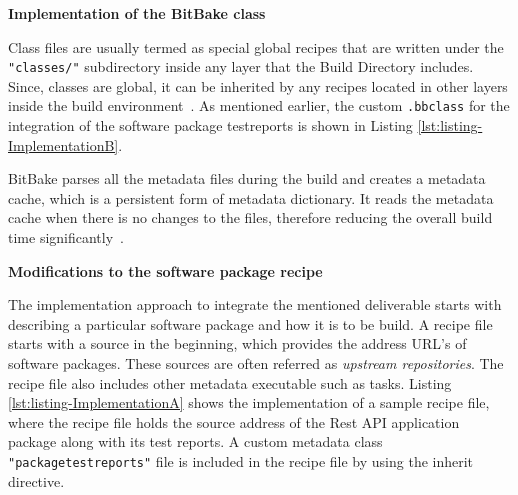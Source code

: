 \vspace{0.5cm}
\lstset{style=mystyle}

\vspace{0.5cm}

\noindent \textbf{Implementation of the BitBake class}
\vspace{0.5cm}

\noindent Class files are usually termed as special global recipes that are written under the \texttt{"classes/"} subdirectory inside any layer that the Build Directory includes. Since, classes are global, it can be inherited by any recipes located in other layers inside the build environment~\parencite{ Reference1}. As mentioned earlier, the custom \texttt{.bbclass} for the integration of the software package testreports is shown in Listing \ref{lst:listing-ImplementationB}.


\vspace{0.5cm}
\lstset{style=mystyle}

\vspace{0.5cm}

BitBake parses all the metadata files during the build and creates a metadata cache, which is a persistent form of metadata dictionary. It reads the metadata cache when there is no changes to the files, therefore reducing the overall build time significantly~\parencite{Reference1}.



\vspace{0.5cm}
\noindent \textbf{Modifications to the software package recipe}
\vspace{0.5cm}

\noindent The implementation approach to integrate the mentioned deliverable starts with describing a particular software package and how it is to be build. A recipe file starts with a source in the beginning, which provides the address \ac{URL}'s of software packages. These sources are often referred as \emph{upstream repositories}. The recipe file also includes other metadata executable such as tasks. Listing \ref{lst:listing-ImplementationA} shows the implementation of a sample recipe file, where the recipe file holds the source address of the Rest API application package along with its test reports. A custom metadata class \texttt{"packagetestreports"} file is included in the recipe file by using the inherit directive.

